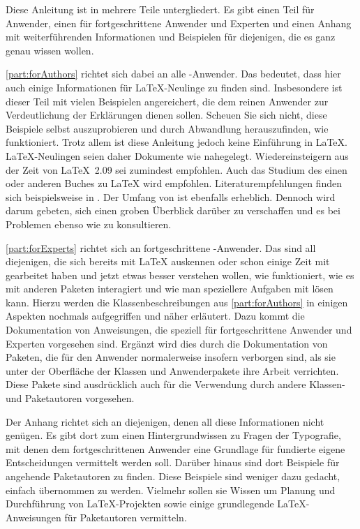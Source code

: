 Diese Anleitung ist in mehrere Teile untergliedert. Es gibt einen Teil für
Anwender, einen für fortgeschrittene Anwender und Experten und einen Anhang
mit weiterführenden Informationen und Beispielen für diejenigen, die es ganz
genau wissen wollen.

\autoref{part:forAuthors} richtet sich dabei an alle \KOMAScript-Anwender. Das
bedeutet, dass hier auch einige Informationen für \LaTeX-Neulinge zu finden
sind. Insbesondere ist dieser Teil mit vielen Beispielen angereichert, die dem
reinen Anwender zur Verdeutlichung der Erklärungen dienen sollen. Scheuen Sie
sich nicht, diese Beispiele selbst auszuprobieren und durch Abwandlung
herauszufinden, wie \KOMAScript{} funktioniert. Trotz allem ist diese
Anleitung jedoch keine Einführung in \LaTeX. \LaTeX-Neulingen seien daher
Dokumente wie \cite{l2kurz} nahegelegt. Wiedereinsteigern aus der Zeit von
\LaTeX~2.09 sei zumindest \cite{latex:usrguide} empfohlen. Auch das Studium des
einen oder anderen Buches zu \LaTeX{} wird empfohlen.  Literaturempfehlungen
finden sich beispielsweise in \cite{DANTE:FAQ}. Der Umfang von
\cite{DANTE:FAQ} ist ebenfalls erheblich. Dennoch wird darum gebeten, sich
einen groben Überblick darüber zu verschaffen und es bei Problemen ebenso wie
 zu konsultieren.

\autoref{part:forExperts} richtet sich an fortgeschrittene
\KOMAScript-Anwender. Das sind all diejenigen, die sich bereits mit \LaTeX{}
auskennen oder schon einige Zeit mit \KOMAScript{} gearbeitet haben und jetzt
etwas besser verstehen wollen, wie \KOMAScript{} funktioniert, wie es mit
anderen Paketen interagiert und wie man speziellere Aufgaben mit \KOMAScript{}
lösen kann. Hierzu werden die Klassenbeschreibungen aus
\autoref{part:forAuthors} in einigen Aspekten nochmals aufgegriffen und näher
erläutert. Dazu kommt die Dokumentation von Anweisungen, die speziell für
fortgeschrittene Anwender und Experten vorgesehen sind. Ergänzt wird dies
durch die Dokumentation von Paketen, die für den Anwender normalerweise insofern
verborgen sind, als sie unter der Oberfläche der Klassen und Anwenderpakete
ihre Arbeit verrichten. Diese Pakete sind ausdrücklich auch für die Verwendung
durch andere Klassen- und Paketautoren vorgesehen.

Der Anhang richtet sich
an diejenigen, denen all diese Informationen nicht genügen. Es gibt dort zum
einen Hintergrundwissen zu Fragen der Typografie, mit denen dem
fortgeschrittenen Anwender eine Grundlage für fundierte eigene Entscheidungen
vermittelt werden soll. Darüber hinaus sind dort Beispiele für angehende
Paketautoren zu finden. Diese Beispiele sind weniger dazu gedacht, einfach
übernommen zu werden. Vielmehr sollen sie Wissen um Planung und Durchführung
von \LaTeX-Projekten sowie einige grundlegende \LaTeX-Anweisungen für
Paketautoren vermitteln.

